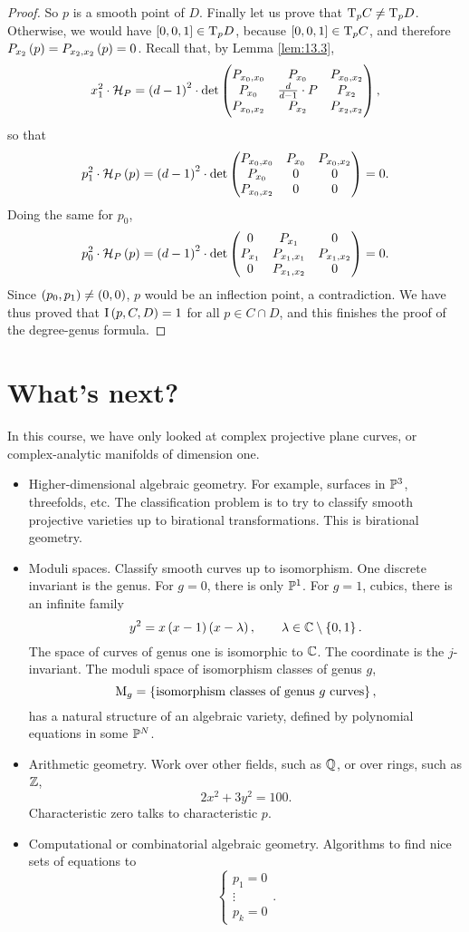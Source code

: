 \begin{proof}
So $ p $ is a smooth point of $ D $. Finally let us prove that $ \mathrm{T}_p C \ne \mathrm{T}_p D $. Otherwise, we would have $ \sbr{0, 0, 1} \in \T_p D $, because $ \sbr{0, 0, 1} \in \T_p C $, and therefore $ P_{x_2}\br{p} = P_{x_2, x_2}\br{p} = 0 $. Recall that, by Lemma \ref{lem:13.3},
$$ x_1^2 \cdot \HHH_P = \br{d - 1}^2 \cdot \det \threebythree{P_{x_0, x_0}}{P_{x_0}}{P_{x_0, x_2}}{P_{x_0}}{\tfrac{d}{d - 1} \cdot P}{P_{x_2}}{P_{x_0, x_2}}{P_{x_2}}{P_{x_2, x_2}}, $$
so that
$$ p_1^2 \cdot \HHH_P\br{p} = \br{d - 1}^2 \cdot \det \threebythree{P_{x_0, x_0}}{P_{x_0}}{P_{x_0, x_2}}{P_{x_0}}{0}{0}{P_{x_0, x_2}}{0}{0} = 0. $$
Doing the same for $ p_0 $,
$$ p_0^2 \cdot \HHH_P\br{p} = \br{d - 1}^2 \cdot \det \threebythree{0}{P_{x_1}}{0}{P_{x_1}}{P_{x_1, x_1}}{P_{x_1, x_2}}{0}{P_{x_1, x_2}}{0} = 0. $$
Since $ \br{p_0, p_1} \ne \br{0, 0} $, $ p $ would be an inflection point, a contradiction. We have thus proved that $ \I\br{p, C, D} = 1 $ for all $ p \in C \cap D $, and this finishes the proof of the degree-genus formula.
\end{proof}

\pagebreak

\appendix

\section{What's next?}

In this course, we have only looked at complex projective plane curves, or complex-analytic manifolds of dimension one.
\begin{itemize}
\item Higher-dimensional algebraic geometry. For example, surfaces in $ \mathbb{P}^3 $, threefolds, etc. The classification problem is to try to classify smooth projective varieties up to birational transformations. This is birational geometry.
\item Moduli spaces. Classify smooth curves up to isomorphism. One discrete invariant is the genus. For $ g = 0 $, there is only $ \mathbb{P}^1 $. For $ g = 1 $, cubics, there is an infinite family
$$ y^2 = x\br{x - 1}\br{x - \lambda}, \qquad \lambda \in \CC \setminus \cbr{0, 1}. $$
The space of curves of genus one is isomorphic to $ \mathbb{C} $. The coordinate is the $ j $-invariant. The moduli space of isomorphism classes of genus $ g $,
$$ \M_g = \cbr{\text{isomorphism classes of genus} \ g \ \text{curves}}, $$
has a natural structure of an algebraic variety, defined by polynomial equations in some $ \mathbb{P}^N $.
\item Arithmetic geometry. Work over other fields, such as $ \mathbb{Q} $, or over rings, such as $ \mathbb{Z} $,
$$ 2x^2 + 3y^2 = 100. $$
Characteristic zero talks to characteristic $ p $.
\item Computational or combinatorial algebraic geometry. Algorithms to find nice sets of equations to
$$
\begin{cases}
p_1 = 0 \\
\vdots \\
p_k = 0
\end{cases}.
$$
\end{itemize}

